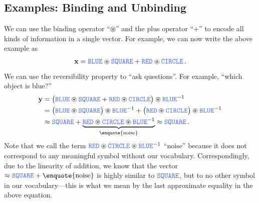 \documentclass[10pt,letterpaper,oneside]{article}
\begin{document}
\subsection{Examples: Binding and Unbinding}
We can use the binding operator \enquote{$\circledast$} and the plus operator \enquote{$+$} to encode all kinds of information in a single vector. For example, we can now write the above example as
\begin{align*}
	\vec x = \Obj{BLUE} \CC \Obj{SQUARE} + \Obj{RED} \CC \Obj{CIRCLE} \,.
\end{align*}
We can use the reversibility property to \enquote{ask questions}. For example, \enquote{which object is blue?}
\begin{align*}
	\vec y &= \big( \Obj{BLUE} \CC \Obj{SQUARE} + \Obj{RED} \CC \Obj{CIRCLE} \big) \CC \Obj{BLUE}^{-1} \\
		   &= \big( \Obj{BLUE} \CC \Obj{SQUARE} \big) \CC \Obj{BLUE}^{-1} + \big( \Obj{RED} \CC \Obj{CIRCLE} \big) \CC \Obj{BLUE}^{-1} \\
		   &\approx \Obj{SQUARE} + \underbrace{\Obj{RED} \CC \Obj{CIRCLE} \CC \Obj{BLUE}^{-1}}_{\text{\enquote{noise}}} 
		    \approx \Obj{SQUARE} \,.
\end{align*}
Note that we call the term $\Obj{RED} \CC \Obj{CIRCLE} \CC \Obj{BLUE}^{-1}$ \enquote{noise} because it does not correspond to any meaningful symbol without our vocabulary. Correspondingly, due to the linearity of addition, we know that the vector $\approx \Obj{SQUARE} + \text{\enquote{noise}}$ is highly similar to $\Obj{SQUARE}$, but to no other symbol in our vocabulary---this is what we mean by the last approximate equality in the above equation.
\end{document}
